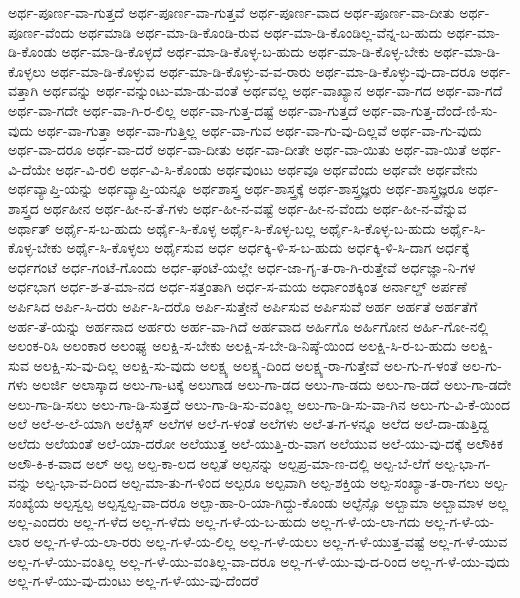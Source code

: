 {ಅರ್ಥ-ಪೂರ್ಣ-ವಾ-ಗುತ್ತದೆ
ಅರ್ಥ-ಪೂರ್ಣ-ವಾ-ಗುತ್ತವೆ
ಅರ್ಥ-ಪೂರ್ಣ-ವಾದ
ಅರ್ಥ-ಪೂರ್ಣ-ವಾ-ದೀತು
ಅರ್ಥ-ಪೂರ್ಣ-ವೆಂದು
ಅರ್ಥಮಾಡಿ
ಅರ್ಥ-ಮಾ-ಡಿ-ಕೊಂಡಿ-ರುವ
ಅರ್ಥ-ಮಾ-ಡಿ-ಕೊಂಡಿಲ್ಲ-ವೆನ್ನ-ಬ-ಹುದು
ಅರ್ಥ-ಮಾ-ಡಿ-ಕೊಂಡು
ಅರ್ಥ-ಮಾ-ಡಿ-ಕೊಳ್ಳದೆ
ಅರ್ಥ-ಮಾ-ಡಿ-ಕೊಳ್ಳ-ಬ-ಹುದು
ಅರ್ಥ-ಮಾ-ಡಿ-ಕೊಳ್ಳ-ಬೇಕು
ಅರ್ಥ-ಮಾ-ಡಿ-ಕೊಳ್ಳಲು
ಅರ್ಥ-ಮಾ-ಡಿ-ಕೊಳ್ಳುವ
ಅರ್ಥ-ಮಾ-ಡಿ-ಕೊಳ್ಳು-ವ-ವ-ರಾರು
ಅರ್ಥ-ಮಾ-ಡಿ-ಕೊಳ್ಳು-ವು-ದಾ-ದರೂ
ಅರ್ಥ-ವತ್ತಾಗಿ
ಅರ್ಥವನ್ನು
ಅರ್ಥ-ವನ್ನುಂಟು-ಮಾ-ಡು-ವಂತೆ
ಅರ್ಥವಲ್ಲ
ಅರ್ಥ-ವಾಖ್ಯಾನ
ಅರ್ಥ-ವಾ-ಗದ
ಅರ್ಥ-ವಾ-ಗದೆ
ಅರ್ಥ-ವಾ-ಗದೇ
ಅರ್ಥ-ವಾ-ಗಿ-ರ-ಲಿಲ್ಲ
ಅರ್ಥ-ವಾ-ಗುತ್ತ-ದಷ್ಟೆ
ಅರ್ಥ-ವಾ-ಗುತ್ತದೆ
ಅರ್ಥ-ವಾ-ಗುತ್ತ-ದೆಂದೆ-ಣಿ-ಸು-ವುದು
ಅರ್ಥ-ವಾ-ಗುತ್ತಾ
ಅರ್ಥ-ವಾ-ಗುತ್ತಿಲ್ಲ
ಅರ್ಥ-ವಾ-ಗುವ
ಅರ್ಥ-ವಾ-ಗು-ವು-ದಿಲ್ಲವೆ
ಅರ್ಥ-ವಾ-ಗು-ವುದು
ಅರ್ಥ-ವಾ-ದರೂ
ಅರ್ಥ-ವಾ-ದರೆ
ಅರ್ಥ-ವಾ-ದೀತು
ಅರ್ಥ-ವಾ-ದೀತೇ
ಅರ್ಥ-ವಾ-ಯಿತು
ಅರ್ಥ-ವಾ-ಯಿತೆ
ಅರ್ಥ-ವಿ-ದೆಯೇ
ಅರ್ಥ-ವಿ-ರಲಿ
ಅರ್ಥ-ವಿ-ಸಿ-ಕೊಂಡು
ಅರ್ಥವುಂಟು
ಅರ್ಥವೂ
ಅರ್ಥವೆಂದು
ಅರ್ಥವೇ
ಅರ್ಥವೇನು
ಅರ್ಥವ್ಯಾಪ್ತಿ-ಯನ್ನು
ಅರ್ಥವ್ಯಾಪ್ತಿ-ಯನ್ನೂ
ಅರ್ಥಶಾಸ್ತ್ರ
ಅರ್ಥ-ಶಾಸ್ತ್ರಕ್ಕೆ
ಅರ್ಥ-ಶಾಸ್ತ್ರಜ್ಞರು
ಅರ್ಥ-ಶಾಸ್ತ್ರಜ್ಞರೂ
ಅರ್ಥ-ಶಾಸ್ತ್ರದ
ಅರ್ಥಹೀನ
ಅರ್ಥ-ಹೀ-ನ-ತೆ-ಗಳು
ಅರ್ಥ-ಹೀ-ನ-ವಷ್ಟೆ
ಅರ್ಥ-ಹೀ-ನ-ವೆಂದು
ಅರ್ಥ-ಹೀ-ನ-ವೆನ್ನುವ
ಅರ್ಥಾತ್
ಅರ್ಥೈ-ಸ-ಬ-ಹುದು
ಅರ್ಥೈ-ಸಿ-ಕೊಳ್ಳ
ಅರ್ಥೈ-ಸಿ-ಕೊಳ್ಳ-ಬಲ್ಲ
ಅರ್ಥೈ-ಸಿ-ಕೊಳ್ಳ-ಬ-ಹುದು
ಅರ್ಥೈ-ಸಿ-ಕೊಳ್ಳ-ಬೇಕು
ಅರ್ಥೈ-ಸಿ-ಕೊಳ್ಳಲು
ಅರ್ಥೈಸುವ
ಅರ್ಧ
ಅರ್ಧಕ್ಕಿ-ಳಿ-ಸ-ಬ-ಹುದು
ಅರ್ಧಕ್ಕಿ-ಳಿ-ಸಿ-ದಾಗ
ಅರ್ಧಕ್ಕೆ
ಅರ್ಧಗಂಟೆ
ಅರ್ಧ-ಗಂಟೆ-ಗೊಂದು
ಅರ್ಧ-ಘಂಟೆ-ಯಲ್ಲೇ
ಅರ್ಧ-ಜಾ-ಗೃ-ತ-ರಾ-ಗಿ-ರುತ್ತೇವೆ
ಅರ್ಧಜ್ಞಾ-ನಿ-ಗಳ
ಅರ್ಧಭಾಗ
ಅರ್ಧ-ಶ-ತ-ಮಾ-ನದ
ಅರ್ಧ-ಸತ್ತಂತಾಗಿ
ಅರ್ಧ-ಸ-ಮಯ
ಅರ್ಧಾಂಶಕ್ಕಿಂತ
ಅರ್ನಾಲ್ಡ್
ಅರ್ಪಣೆ
ಅರ್ಪಿಸಿದ
ಅರ್ಪಿ-ಸಿ-ದರು
ಅರ್ಪಿ-ಸಿ-ದರೊ
ಅರ್ಪಿ-ಸುತ್ತೇನೆ
ಅರ್ಪಿಸುವ
ಅರ್ಪಿಸುವೆ
ಅರ್ಹ
ಅರ್ಹತೆ
ಅರ್ಹತೆಗೆ
ಅರ್ಹ-ತೆ-ಯನ್ನು
ಅರ್ಹನಾದ
ಅರ್ಹರು
ಅರ್ಹ-ವಾ-ಗಿದೆ
ಅರ್ಹವಾದ
ಅರ್ಹಿಗೊ
ಅರ್ಹಿಗೋನ
ಅರ್ಹಿ-ಗೋ-ನಲ್ಲಿ
ಅಲಂಕ-ರಿಸಿ
ಅಲಂಕಾರ
ಅಲಂಘ್ಯ
ಅಲಕ್ಷಿ-ಸ-ಬೇಕು
ಅಲಕ್ಷಿ-ಸ-ಬೇ-ಡಿ-ನಿಷ್ಠೆ-ಯಿಂದ
ಅಲಕ್ಷಿ-ಸಿ-ರ-ಬ-ಹುದು
ಅಲಕ್ಷಿ-ಸುವ
ಅಲಕ್ಷಿ-ಸು-ವು-ದಿಲ್ಲ
ಅಲಕ್ಷಿ-ಸು-ವುದು
ಅಲಕ್ಷ್ಯ
ಅಲಕ್ಷ್ಯ-ದಿಂದ
ಅಲಕ್ಷ್ಯ-ರಾ-ಗುತ್ತೇವೆ
ಅಲ-ಗು-ಗ-ಳಂತೆ
ಅಲ-ಗು-ಗಳು
ಅಲರ್ಜಿ
ಅಲಾಸ್ಕಾದ
ಅಲು-ಗಾ-ಟಕ್ಕೆ
ಅಲುಗಾಡ
ಅಲು-ಗಾ-ಡದ
ಅಲು-ಗಾ-ಡದು
ಅಲು-ಗಾ-ಡದೆ
ಅಲು-ಗಾ-ಡದೇ
ಅಲು-ಗಾ-ಡಿ-ಸಲು
ಅಲು-ಗಾ-ಡಿ-ಸುತ್ತದೆ
ಅಲು-ಗಾ-ಡಿ-ಸು-ವಂತಿಲ್ಲ
ಅಲು-ಗಾ-ಡಿ-ಸು-ವಾ-ಗಿನ
ಅಲು-ಗು-ವಿ-ಕೆ-ಯಿಂದ
ಅಲೆ
ಅಲೆ-ಅ-ಲೆ-ಯಾಗಿ
ಅಲೆಕ್ಸಿಸ್
ಅಲೆಗಳ
ಅಲೆ-ಗ-ಳಂತೆ
ಅಲೆಗಳು
ಅಲೆ-ತ-ಗ-ಳನ್ನೂ
ಅಲೆದ
ಅಲೆ-ದಾ-ಡುತ್ತಿದ್ದ
ಅಲೆದು
ಅಲೆಯಂತೆ
ಅಲೆ-ಯಾ-ದರೋ
ಅಲೆಯುತ್ತ
ಅಲೆ-ಯುತ್ತಿ-ರು-ವಾಗ
ಅಲೆಯುವ
ಅಲೆ-ಯು-ವು-ದಕ್ಕೆ
ಅಲೌಕಿಕ
ಅಲೌ-ಕಿ-ಕ-ವಾದ
ಅಲ್
ಅಲ್ಪ
ಅಲ್ಪ-ಕಾ-ಲದ
ಅಲ್ಪತೆ
ಅಲ್ಪನನ್ನು
ಅಲ್ಪಪ್ರ-ಮಾ-ಣ-ದಲ್ಲಿ
ಅಲ್ಪ-ಬೆ-ಲೆಗೆ
ಅಲ್ಪ-ಭಾ-ಗ-ವನ್ನು
ಅಲ್ಪ-ಭಾ-ವ-ದಿಂದ
ಅಲ್ಪ-ಮಾ-ತು-ಗ-ಳಿಂದ
ಅಲ್ಪರೂ
ಅಲ್ಪವಾಗಿ
ಅಲ್ಪ-ಶಕ್ತಿಯ
ಅಲ್ಪ-ಸಂಖ್ಯಾ-ತ-ರಾ-ಗಲು
ಅಲ್ಪ-ಸಂಖ್ಯೆಯ
ಅಲ್ಪಸ್ವಲ್ಪ
ಅಲ್ಪಸ್ವಲ್ಪ-ವಾ-ದರೂ
ಅಲ್ಪಾ-ಹಾ-ರಿ-ಯಾ-ಗಿದ್ದು-ಕೊಂಡು
ಅಲ್ಫೆನ್ಸೊ
ಅಲ್ಬಾಮಾ
ಅಲ್ಬಾಮಾಳ
ಅಲ್ಲ
ಅಲ್ಲ-ಎಂದರು
ಅಲ್ಲ-ಗ-ಳೆದ
ಅಲ್ಲ-ಗ-ಳೆದು
ಅಲ್ಲ-ಗ-ಳೆ-ಯ-ಬ-ಹುದು
ಅಲ್ಲ-ಗ-ಳೆ-ಯ-ಲಾ-ಗದು
ಅಲ್ಲ-ಗ-ಳೆ-ಯ-ಲಾರ
ಅಲ್ಲ-ಗ-ಳೆ-ಯ-ಲಾ-ರರು
ಅಲ್ಲ-ಗ-ಳೆ-ಯ-ಲಿಲ್ಲ
ಅಲ್ಲ-ಗ-ಳೆ-ಯಲು
ಅಲ್ಲ-ಗ-ಳೆ-ಯುತ್ತ-ವಷ್ಟೆ
ಅಲ್ಲ-ಗ-ಳೆ-ಯುವ
ಅಲ್ಲ-ಗ-ಳೆ-ಯು-ವಂತಿಲ್ಲ
ಅಲ್ಲ-ಗ-ಳೆ-ಯು-ವಂತಿಲ್ಲ-ವಾ-ದರೂ
ಅಲ್ಲ-ಗ-ಳೆ-ಯು-ವು-ದ-ರಿಂದ
ಅಲ್ಲ-ಗ-ಳೆ-ಯು-ವುದು
ಅಲ್ಲ-ಗ-ಳೆ-ಯು-ವು-ದುಂಟು
ಅಲ್ಲ-ಗ-ಳೆ-ಯು-ವು-ದೆಂದರೆ
}
